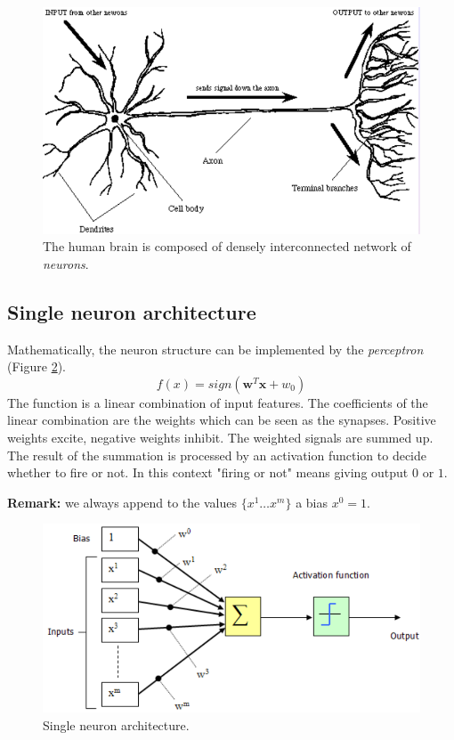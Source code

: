 \begin{figure}
    \centering
    \includegraphics[scale=0.5]{images/brainNetwork.png}
    \caption{The human brain is composed of densely interconnected network of \textit{neurons}.}
    \label{fig:brainNetwork}
\end{figure}

\subsection{Single neuron architecture} 
Mathematically, the neuron structure can be implemented by the \textit{perceptron} (Figure \ref{fig:singleNeuronArchitecture}).
\begin{equation}
    \label{eq:SingleNeuronArchitecture}
    f(x) = \mathit{sign}(\pmb{w}^T \pmb{x} + w_0)
\end{equation}
The function is a linear combination of input features. The coefficients of the linear combination are the weights which can be seen as the synapses. Positive weights excite, negative weights inhibit. The weighted signals are summed up. The result of the summation is processed by an activation function to decide whether to fire or not. In this context "firing or not" means giving output $0$ or $1$. \newline

\textbf{Remark:} we always append to the values $\{x^1 \hdots x^m\}$ a bias $x^0 = 1$.

\begin{figure}
    \centering
    \includegraphics[scale=0.5]{images/singleNeuronArchitecture.png}
    \caption{Single neuron architecture.}
    \label{fig:singleNeuronArchitecture}
\end{figure}


